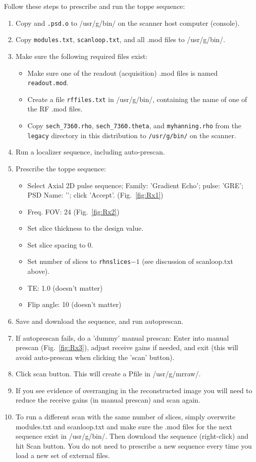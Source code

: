 Follow these steps to prescribe and run the toppe sequence:
\begin{enumerate}
	\item Copy {\tt \psdname} and {\tt \psdname.psd.o} to /usr/g/bin/ on the scanner host computer (console).
	\item Copy {\tt modules.txt}, {\tt scanloop.txt}, and all .mod files to /usr/g/bin/.
	\item Make sure the following required files exist:
	\begin{itemize}
		\item Make sure one of the readout (acquisition) .mod files is named {\tt readout.mod}.
		\item Create a file {\tt rffiles.txt} in /usr/g/bin/, containing the name of one of the RF .mod files.
		\item Copy \texttt{sech\_7360.rho}, \texttt{sech\_7360.theta}, and \texttt{myhanning.rho} from the \texttt{legacy} directory in this distribution to \texttt{/usr/g/bin/} on the scanner.
	\end{itemize}
	\item Run a localizer sequence, including auto-prescan.
	\item Prescribe the toppe sequence:
\begin{itemize}
	\item Select Axial 2D pulse sequence; Family: 'Gradient Echo'; pulse: 'GRE'; PSD Name: '\psdname'; click 'Accept'. (Fig.~\ref{fig:Rx1})
	\item Freq. FOV: 24 (Fig.~\ref{fig:Rx2})
	\item Set slice thickness to the design value.
	\item Set slice spacing to 0.
	\item Set number of slices to {\tt rhnslices}$-1$ (see discussion of scanloop.txt above).
	\item TE: 1.0   (doesn't matter)
	\item Flip angle: 10  (doesn't matter)
\end{itemize}
	\item Save and download the sequence, and run autoprescan.
	\item If autoprescan fails, do a 'dummy' manual prescan: Enter into manual prescan (Fig.~\ref{fig:Rx3}), adjust receive gains if needed, and exit (this will avoid auto-prescan when clicking the 'scan' button).
	\item Click scan button. This will create a Pfile in /usr/g/mrraw/.
	\item If you see evidence of overranging in the reconstructed image you will need to reduce the receive gains (in manual prescan) and scan again.
	\item To run a different scan with the same number of slices, simply overwrite modules.txt and scanloop.txt and make sure the .mod files for the next sequence exist in /usr/g/bin/. Then download the sequence (right-click) and hit Scan button. You do not need to prescribe a new sequence every time you load a new set of external files.
\end{enumerate}

